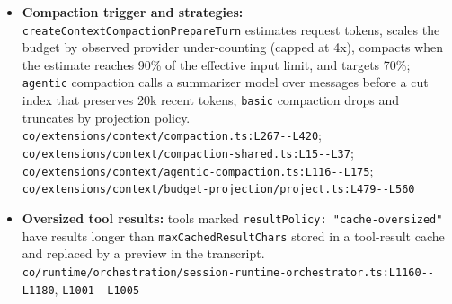 \begin{itemize}
\item \textbf{Compaction trigger and strategies:} \texttt{createContextCompactionPrepareTurn} estimates request tokens, scales the budget by observed provider under-counting (capped at 4x), compacts when the estimate reaches 90\% of the effective input limit, and targets 70\%; \texttt{agentic} compaction calls a summarizer model over messages before a cut index that preserves 20k recent tokens, \texttt{basic} compaction drops and truncates by projection policy. \texttt{co/\allowbreak{}extensions/\allowbreak{}context/\allowbreak{}compaction.\allowbreak{}ts:\allowbreak{}L267-\allowbreak{}-\allowbreak{}L420}; \texttt{co/\allowbreak{}extensions/\allowbreak{}context/\allowbreak{}compaction-\allowbreak{}shared.\allowbreak{}ts:\allowbreak{}L15-\allowbreak{}-\allowbreak{}L37}; \texttt{co/\allowbreak{}extensions/\allowbreak{}context/\allowbreak{}agentic-\allowbreak{}compaction.\allowbreak{}ts:\allowbreak{}L116-\allowbreak{}-\allowbreak{}L175}; \texttt{co/\allowbreak{}extensions/\allowbreak{}context/\allowbreak{}budget-\allowbreak{}projection/\allowbreak{}project.\allowbreak{}ts:\allowbreak{}L479-\allowbreak{}-\allowbreak{}L560}
\item \textbf{Oversized tool results:} tools marked \texttt{resultPolicy:\allowbreak{} "cache-\allowbreak{}oversized"} have results longer than \texttt{maxCachedResultChars} stored in a tool-result cache and replaced by a preview in the transcript. \texttt{co/\allowbreak{}runtime/\allowbreak{}orchestration/\allowbreak{}session-\allowbreak{}runtime-\allowbreak{}orchestrator.\allowbreak{}ts:\allowbreak{}L1160-\allowbreak{}-\allowbreak{}L1180}, \texttt{L1001-\allowbreak{}-\allowbreak{}L1005}
\end{itemize}

